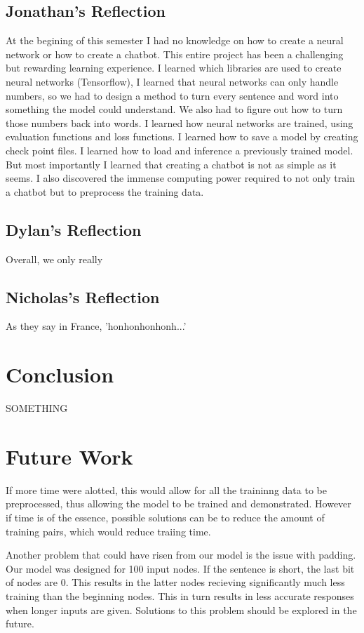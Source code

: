 \documentclass[11pt,twocolumn]{article}
\begin{document}
\subsection*{Jonathan's Reflection}
At the begining of this semester I had no knowledge on how to create a neural network or how to create a chatbot.  This entire project has been a challenging but rewarding learning experience.  I learned which libraries are used to create neural networks (Tensorflow), I learned that neural networks can only handle numbers, so we had to design a method to turn every sentence and word into something the model could understand.  We also had to figure out how to turn those numbers back into words.  I learned how neural networks are trained, using evaluation functions and loss functions.  I learned how to save a model by creating check point files.  I learned how to load and inference a previously trained model.  But most importantly I learned that creating a chatbot is not as simple as it seems.  I also discovered the immense computing power required to not only train a chatbot but to preprocess the training data.
\subsection*{Dylan's Reflection}
Overall, we only really 
\subsection*{Nicholas's Reflection}
As they say in France, 'honhonhonhonh...'
\section*{Conclusion}
SOMETHING
\section*{Future Work}
If more time were alotted, this would allow for all the traininng data to be preprocessed, thus allowing the model to be trained and demonstrated.  However if time is of the essence, possible solutions can be to reduce the amount of training pairs, which would reduce traiing time.

Another problem that could have risen from our model is the issue with padding.  Our model was designed for 100 input nodes.  If the sentence is short, the last bit of nodes are 0.  This results in the latter nodes recieving significantly much less training than the beginning nodes.  This in turn results in less accurate responses when longer inputs are given.  Solutions to this problem should be explored in the future.




\end{document}
